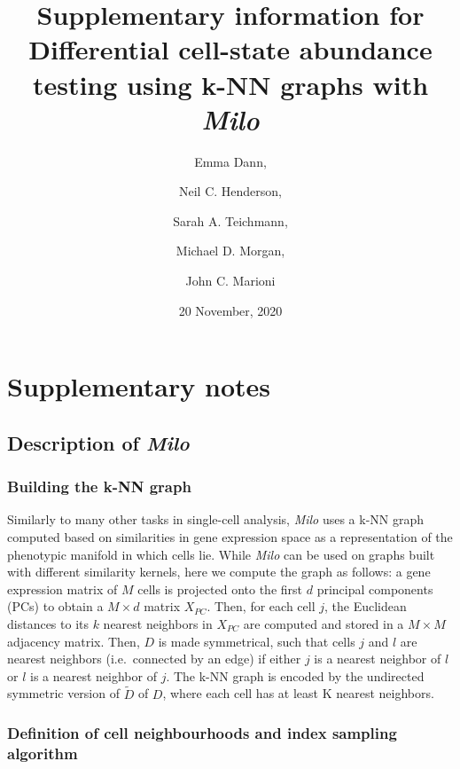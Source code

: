 \documentclass[
]{article}
\title{Supplementary information for
\textbf{Differential cell-state abundance testing using k-NN graphs with \emph{Milo}}}
\author{Emma Dann, \and Neil C. Henderson, \and Sarah A. Teichmann, \and Michael D. Morgan, \and John C. Marioni}
\date{20 November, 2020}
\begin{document}
\maketitle

{
\setcounter{tocdepth}{3}
\tableofcontents
}
\renewcommand{\figurename}{Supplementary Figure}

\newpage

\hypertarget{supplementary-notes}{%
\section{Supplementary notes}\label{supplementary-notes}}

\hypertarget{description-of-milo}{%
\subsection{\texorpdfstring{Description of \emph{Milo}}{Description of Milo}}\label{description-of-milo}}

\hypertarget{building-the-k-nn-graph}{%
\subsubsection{Building the k-NN graph}\label{building-the-k-nn-graph}}

Similarly to many other tasks in single-cell analysis, \emph{Milo} uses a k-NN graph computed based on similarities in gene expression space as a representation of the phenotypic manifold in which cells lie. While \emph{Milo} can be used on graphs built with different similarity kernels, here we compute the graph as follows: a gene expression matrix of \(M\) cells is projected onto the first \(d\) principal components (PCs) to obtain a \(M \times d\) matrix \(X_{PC}\). Then, for each cell \(j\), the Euclidean distances to its \(k\) nearest neighbors in \(X_{PC}\) are computed and stored in a \(M \times M\) adjacency matrix. Then, \(D\) is made symmetrical, such that cells \(j\) and \(l\) are nearest neighbors (i.e.~connected by an edge) if either \(j\) is a nearest neighbor of \(l\) or \(l\) is a nearest neighbor of \(j\). The k-NN graph is encoded by the undirected symmetric version of \(\tilde{D}\) of \(D\), where each cell has at least K nearest neighbors.

\hypertarget{definition-of-cell-neighbourhoods-and-index-sampling-algorithm}{%
\subsubsection{Definition of cell neighbourhoods and index sampling algorithm}\label{definition-of-cell-neighbourhoods-and-index-sampling-algorithm}}
\end{document}
